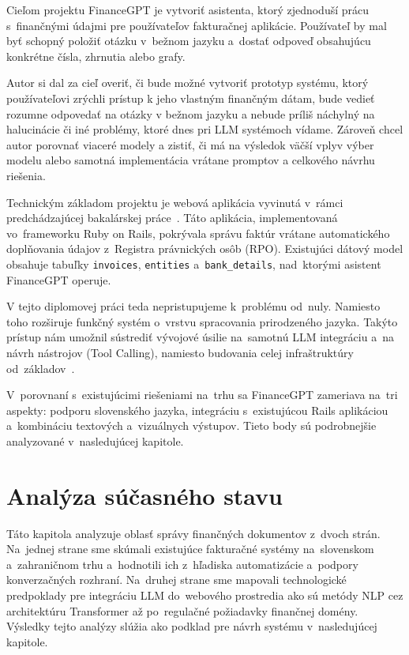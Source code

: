Cieľom projektu FinanceGPT je vytvoriť asistenta, ktorý zjednoduší prácu s~finančnými
údajmi pre používateľov fakturačnej aplikácie. Používateľ by mal byť schopný položiť
otázku v~bežnom jazyku a~dostať odpoveď obsahujúcu konkrétne čísla, zhrnutia
alebo grafy.

Autor si dal za cieľ overiť, či bude možné vytvoriť prototyp systému, ktorý
používateľovi zrýchli prístup k jeho vlastným finančným dátam, bude vedieť rozumne
odpovedať na otázky v bežnom jazyku a nebude príliš náchylný na halucinácie či iné
problémy, ktoré dnes pri LLM systémoch vídame. Zároveň chcel autor porovnať viaceré
modely a zistiť, či má na výsledok väčší vplyv výber modelu alebo samotná
implementácia vrátane promptov a celkového návrhu riešenia.

Technickým základom projektu je webová aplikácia vyvinutá v~rámci
predchádzajúcej bakalárskej práce~\cite{gasparovic2023}. Táto aplikácia,
implementovaná vo~frameworku Ruby on Rails, pokrývala správu faktúr vrátane automatického
doplňovania údajov z~Registra právnických osôb (RPO). Existujúci dátový model
obsahuje tabuľky \texttt{invoices}, \texttt{entities} a~\texttt{bank\_details}, nad~ktorými
asistent FinanceGPT operuje.

V tejto diplomovej práci teda nepristupujeme k~problému od~nuly. Namiesto toho
rozširuje funkčný systém o~vrstvu spracovania prirodzeného jazyka. Takýto prístup
nám umožnil sústrediť vývojové úsilie na~samotnú LLM integráciu a~na návrh nástrojov
(Tool Calling), namiesto budovania celej infraštruktúry od~základov~\cite{ruby2025}.

V~porovnaní s~existujúcimi riešeniami na~trhu sa FinanceGPT zameriava na~tri
aspekty: podporu slovenského jazyka, integráciu s~existujúcou Rails aplikáciou a~kombináciu
textových a~vizuálnych výstupov. Tieto body sú podrobnejšie analyzované v~nasledujúcej
kapitole.

\section{Analýza súčasného stavu}

Táto kapitola analyzuje oblasť správy finančných dokumentov z~dvoch strán. Na~jednej
strane sme skúmali existujúce fakturačné systémy na~slovenskom a~zahraničnom trhu
a~hodnotili ich z~hľadiska automatizácie a~podpory konverzačných rozhraní. Na~druhej
strane sme mapovali technologické predpoklady pre integráciu LLM do~webového
prostredia ako sú metódy NLP cez architektúru Transformer až po~regulačné
požiadavky finančnej domény. Výsledky tejto analýzy slúžia ako podklad pre návrh systému
v~nasledujúcej kapitole.

